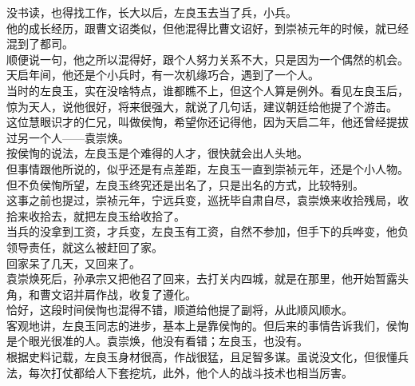 \begin{multicols}{\theparacolNo}
没书读，也得找工作，长大以后，左良玉去当了兵，小兵。\\

他的成长经历，跟曹文诏类似，但他混得比曹文诏好，到崇祯元年的时候，就已经混到了都司。\\

顺便说一句，他之所以混得好，跟个人努力关系不大，只是因为一个偶然的机会。\\

天启年间，他还是个小兵时，有一次机缘巧合，遇到了一个人。\\

当时的左良玉，实在没啥特点，谁都瞧不上，但这个人算是例外。看见左良玉后，惊为天人，说他很好，将来很强大，就说了几句话，建议朝廷给他提了个游击。\\

这位慧眼识才的仁兄，叫做侯恂，希望你还记得他，因为天启二年，他还曾经提拔过另一个人——袁崇焕。\\

按侯恂的说法，左良玉是个难得的人才，很快就会出人头地。\\

但事情跟他所说的，似乎还是有点差距，左良玉一直到崇祯元年，还是个小人物。\\

但不负侯恂所望，左良玉终究还是出名了，只是出名的方式，比较特别。\\

这事之前也提过，崇祯元年，宁远兵变，巡抚毕自肃自尽，袁崇焕来收拾残局，收拾来收拾去，就把左良玉给收拾了。\\

当兵的没拿到工资，才兵变，左良玉有工资，自然不参加，但手下的兵哗变，他负领导责任，就这么被赶回了家。\\

回家呆了几天，又回来了。\\

袁崇焕死后，孙承宗又把他召了回来，去打关内四城，就是在那里，他开始暂露头角，和曹文诏并肩作战，收复了遵化。\\

恰好，这段时间侯恂也混得不错，顺道给他提了副将，从此顺风顺水。\\

客观地讲，左良玉同志的进步，基本上是靠侯恂的。但后来的事情告诉我们，侯恂是个眼光很准的人。袁崇焕，他没有看错；左良玉，也没有。\\

根据史料记载，左良玉身材很高，作战很猛，且足智多谋。虽说没文化，但很懂兵法，每次打仗都给人下套挖坑，此外，他个人的战斗技术也相当厉害。\\


\end{multicols}
